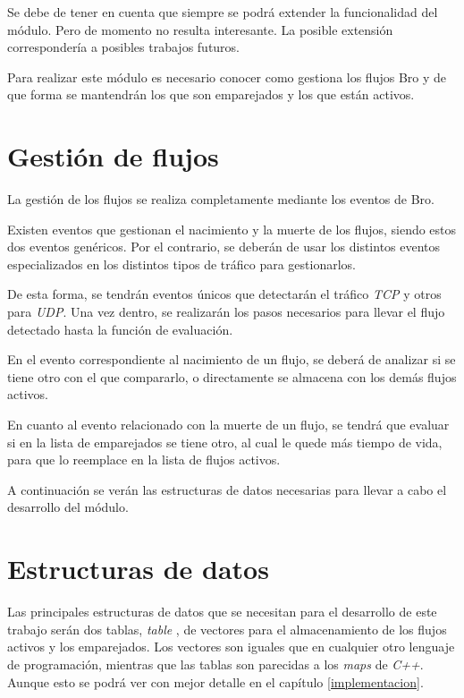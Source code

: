 \intro Se debe de tener en cuenta que siempre se podrá extender la funcionalidad del módulo. Pero de momento no 
resulta interesante. La posible extensión correspondería a posibles trabajos futuros.

\intro Para realizar este módulo es necesario conocer como gestiona los flujos Bro y de que forma se mantendrán 
los que son emparejados y los que están activos.

\section{Gestión de flujos}

La gestión de los flujos se realiza completamente mediante los eventos de Bro.

\intro Existen eventos que gestionan el nacimiento y la muerte de los flujos, siendo estos dos eventos genéricos. Por el contrario, 
se deberán de usar los distintos eventos especializados en los distintos tipos de tráfico para gestionarlos.

\intro De esta forma, se tendrán eventos únicos que detectarán el tráfico \textit{TCP} y otros para \textit{UDP}. Una vez dentro, se 
realizarán los pasos necesarios para llevar el flujo detectado hasta la función de evaluación.

\intro En el evento correspondiente al nacimiento de un flujo, se deberá de analizar si se tiene otro con el que compararlo, o directamente se almacena con los demás flujos activos.

\intro En cuanto al evento relacionado con la muerte de un flujo, se tendrá que evaluar si en la lista de emparejados se tiene otro, al cual le quede más tiempo de vida, para que lo reemplace en la lista de flujos activos.

\intro A continuación se verán las estructuras de datos necesarias para llevar a cabo el desarrollo del módulo.

\section{Estructuras de datos}

Las principales estructuras de datos que se necesitan para el desarrollo de este trabajo serán dos 
tablas, \textit{table} \cite{brotable}, de vectores para el almacenamiento de los flujos activos y los emparejados. 
Los vectores son iguales que en cualquier otro lenguaje de programación, mientras que las tablas son parecidas a los \textit{maps} de \textit{C++}. Aunque esto se podrá ver con mejor detalle en el capítulo \ref{implementacion}.


